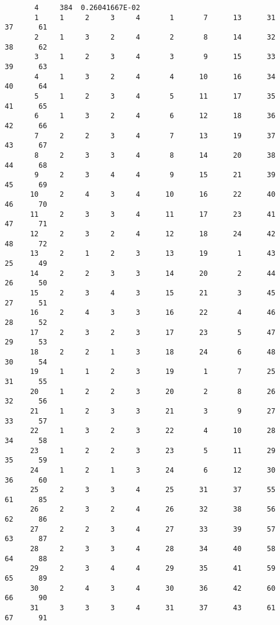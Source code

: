 \begin{verbatim}
       4     384  0.26041667E-02
       1     1     2     3     4       1       7      13      31      37      61
       2     1     3     2     4       2       8      14      32      38      62
       3     1     2     3     4       3       9      15      33      39      63
       4     1     3     2     4       4      10      16      34      40      64
       5     1     2     3     4       5      11      17      35      41      65
       6     1     3     2     4       6      12      18      36      42      66
       7     2     2     3     4       7      13      19      37      43      67
       8     2     3     3     4       8      14      20      38      44      68
       9     2     3     4     4       9      15      21      39      45      69
      10     2     4     3     4      10      16      22      40      46      70
      11     2     3     3     4      11      17      23      41      47      71
      12     2     3     2     4      12      18      24      42      48      72
      13     2     1     2     3      13      19       1      43      25      49 
      14     2     2     3     3      14      20       2      44      26      50 
      15     2     3     4     3      15      21       3      45      27      51 
      16     2     4     3     3      16      22       4      46      28      52 
      17     2     3     2     3      17      23       5      47      29      53 
      18     2     2     1     3      18      24       6      48      30      54 
      19     1     1     2     3      19       1       7      25      31      55 
      20     1     2     2     3      20       2       8      26      32      56 
      21     1     2     3     3      21       3       9      27      33      57 
      22     1     3     2     3      22       4      10      28      34      58 
      23     1     2     2     3      23       5      11      29      35      59 
      24     1     2     1     3      24       6      12      30      36      60 
      25     2     3     3     4      25      31      37      55      61      85 
      26     2     3     2     4      26      32      38      56      62      86 
      27     2     2     3     4      27      33      39      57      63      87 
      28     2     3     3     4      28      34      40      58      64      88 
      29     2     3     4     4      29      35      41      59      65      89 
      30     2     4     3     4      30      36      42      60      66      90 
      31     3     3     3     4      31      37      43      61      67      91 

\end{verbatim}
